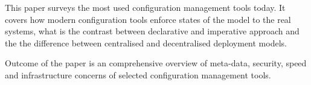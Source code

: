 
This paper surveys the most used configuration management tools today. It covers how modern configuration tools enforce states of the model to the real systems, what is the contrast between declarative and imperative approach and the the difference between centralised and decentralised deployment models.

Outcome of the paper is an comprehensive overview of meta-data, security, speed and infrastructure concerns of selected configuration management tools.
